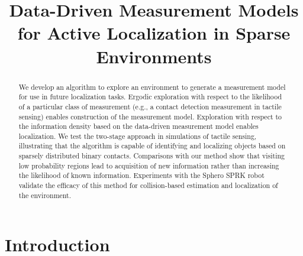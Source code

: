 \documentclass[conference]{IEEEtran}
\begin{document}
\title{Data-Driven Measurement Models for Active Localization in Sparse Environments}


\author{
}





\maketitle

\begin{abstract}
We develop an algorithm to explore an environment to generate a measurement model for use in future localization tasks.
Ergodic exploration with respect to the likelihood of a particular class of measurement (e.g., a contact detection measurement in tactile sensing) enables construction of the measurement model.
Exploration with respect to the information density based on the data-driven measurement model enables localization.
We test the two-stage approach in simulations of tactile sensing, illustrating that the algorithm is capable of identifying and localizing objects based on sparsely distributed binary contacts.
Comparisons with our method show that visiting low probability regions lead to acquisition of new information rather than increasing the likelihood of known information.
Experiments with the Sphero SPRK robot validate the efficacy of this method for collision-based estimation and localization of the environment.

\end{abstract}

\IEEEpeerreviewmaketitle

\section{Introduction}
\end{document}
